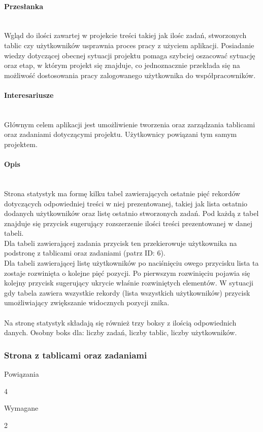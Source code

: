 \documentclass[eng,printmode]{mgr}
\begin{document}
\paragraph{Przesłanka}\ \\
Wgląd do ilości zawartej w projekcie treści takiej jak ilośc zadań, stworzonych tablic czy użytkowników  usprawnia proces pracy z użyciem aplikacji. Posiadanie wiedzy dotyczącej obecnej sytuacji projektu pomaga szybciej oszacować sytuację oraz etap, w którym projekt się znajduje, co jednoznacznie przekłada się na możliwość dostosowania pracy zalogowanego użytkownika do współpracowników.

\paragraph{Interesariusze}\ \\
Głównym celem aplikacji jest umożliwienie tworzenia oraz zarządzania tablicami oraz zadaniami dotyczącymi projektu. Użytkownicy powiązani tym samym projektem.

\paragraph{Opis}\ \\
Strona statystyk ma formę kilku tabel zawierających ostatnie pięć rekordów dotyczących odpowiedniej treści w niej prezentowanej, takiej jak lista ostatnio dodanych użytkowników oraz listę ostatnio stworzonych zadań. Pod każdą z tabel znajduje się przycisk sugerujący rozszerzenie ilości treści prezentowanej w danej tabeli.
\\
Dla tabeli zawierającej zadania przycisk ten przekierowuje użytkownika na podstronę z tablicami oraz zadaniami (patrz ID: 6). 
\\
Dla tabeli zawierającej listę użytkowników po naciśnięciu owego przycisku lista ta zostaje rozwinięta o kolejne pięć pozycji. Po pierwszym rozwinięciu pojawia się kolejny przycisk sugerujący ukrycie właśnie rozwiniętych elementów. W sytuacji gdy tabela zawiera wszystkie rekordy (lista wszystkich użytkowników) przycisk umożliwiający zwiększanie widocznych pozycji znika.
\\ \\
Na stronę statystyk składają się również trzy boksy z ilością odpowiednich danych. Osobny boks dla: liczby zadań, liczby tablic, liczby użytkowników.
\newpage

\subsubsection{Strona z tablicami oraz zadaniami}
\begin{labeling}{Powiązania}
\item [ID:] 4
\item [Typ:] Wymagane
\item [Powiązania] 2
\end{labeling}
\end{document}
